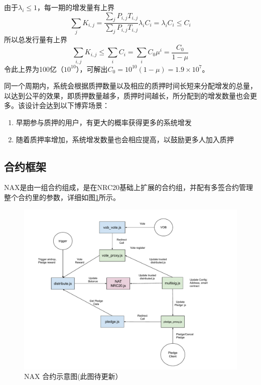 由于\(\lambda_i \le 1\)，每一期的增发量有上界
\begin{equation}
  \sum_j K_{i,j} = \frac{\sum_j P_{i,j} T_{i,j}}{\sum_j P_{i,j} T_{i,j}} \lambda_i C_i = \lambda_i C_i \le C_i
\end{equation}
所以总发行量有上界
\begin{equation}
  \sum_{i,j} K_{i,j} \le \sum_i C_i = \sum_i C_0 \mu^i = \frac{C_0}{1-\mu}
\end{equation}
令此上界为100亿（\(10^{10}\)），可解出\(C_0 = 10^{10}(1-\mu) = 1.9\times10^7\)。


同一个周期内，系统会根据质押数量以及相应的质押时间长短来分配增发的总量，以达到公平的效果，即质押数量越多，质押时间越长，所分配到的增发数量也会更多。该设计会达到以下博弈场景：
\begin{enumerate}
  \item 早期参与质押的用户，有更大的概率获得更多的系统增发
  \item 随着质押率增加，系统增发数量也会相应提高，以鼓励更多人加入质押
\end{enumerate}

\subsection{合约框架}
NAX是由一组合约组成，是在NRC20基础上扩展的合约组，并配有多签合约管理整个合约里的参数，详细如图\ref{fig:nax_framework}所示。

\begin{figure}[htbp]
  \centering
    \includegraphics[width=1\textwidth]{../common/ch/nax.pdf}
    \caption{NAX 合约示意图(此图待更新） \label{fig:nax_framework}}
\end{figure}
